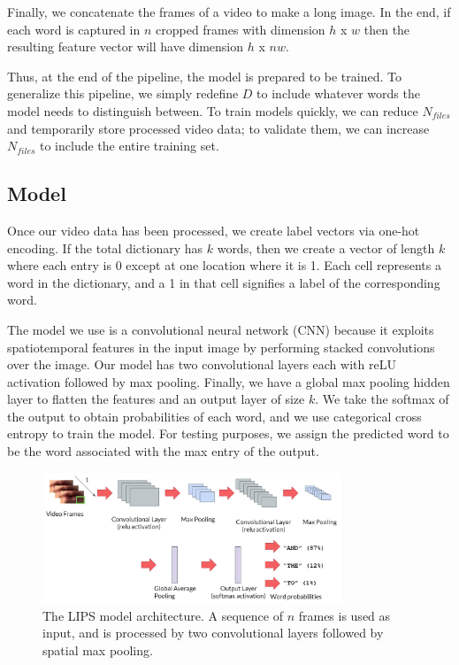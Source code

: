 \documentclass{article}
\begin{document}
Finally, we concatenate the frames of a video to make a long image. In the end, if each word is captured in $n$ cropped frames with dimension $h$ x $w$ then the resulting feature vector will have dimension $h$ x $nw$.

Thus, at the end of the pipeline, the model is prepared to be trained. To generalize this pipeline, we simply redefine $D$ to include whatever words the model needs to distinguish between. To train models quickly, we can reduce $N_{files}$ and temporarily store processed video data; to validate them, we can increase $N_{files}$ to include the entire training set.

\subsection{Model}

Once our video data has been processed, we create label vectors via one-hot encoding. If the total dictionary has $k$ words, then we create a vector of length $k$ where each entry is 0 except at one location where it is 1. Each cell represents a word in the dictionary, and a 1 in that cell signifies a label of the corresponding word.

The model we use is a convolutional neural network (CNN) because it exploits spatiotemporal features in the input image by performing stacked convolutions over the image. Our model has two convolutional layers each with reLU activation followed by max pooling. Finally, we have a global max pooling hidden layer to flatten the features and an output layer of size $k$. We take the softmax of the output to obtain probabilities of each word, and we use categorical cross entropy to train the model. For testing purposes, we assign the predicted word to be the word associated with the max entry of the output.

   \begin{figure}[h!]
 \centering
  \includegraphics[width=0.8\textwidth]{model}
 \caption{The LIPS model architecture. A sequence of $n$ frames is used as input, and is processed by two convolutional layers followed by spatial max pooling.}
 \end{figure}
\end{document}
